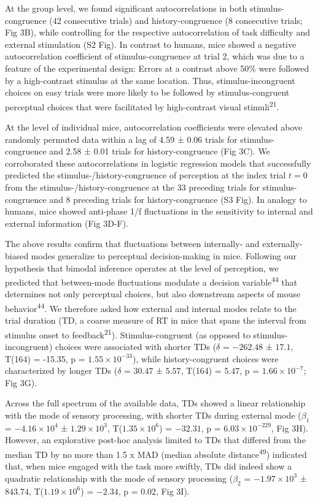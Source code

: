 \documentclass[
]{article}
\begin{document}
At the group level, we found significant autocorrelations in both
stimulus-congruence (42 consecutive trials) and history-congruence (8
consecutive trials; Fig 3B), while controlling for the respective
autocorrelation of task difficulty and external stimulation
(S2 Fig). In contrast to humans, mice showed a
negative autocorrelation coefficient of stimulus-congruence at trial 2,
which was due to a feature of the experimental design: Errors at a
contrast above 50\% were followed by a high-contrast stimulus at the
same location. Thus, stimulus-incongruent choices on easy trials were
more likely to be followed by stimulus-congruent perceptual choices that
were facilitated by high-contrast visual stimuli\textsuperscript{21}.

At the level of individual mice, autocorrelation coefficients were
elevated above randomly permuted data within a lag of 4.59 ± 0.06 trials
for stimulus-congruence and 2.58 ± 0.01 trials for history-congruence
(Fig 3C). We corroborated these autocorrelations in logistic
regression models that successfully predicted the
stimulus-/history-congruence of perception at the index trial \(t = 0\)
from the stimulus-/history-congruence at the 33 preceding trials for
stimulus-congruence and 8 preceding trials for history-congruence
(S3 Fig). In analogy to humans, mice showed anti-phase
1/f fluctuations in the sensitivity to internal and external information
(Fig 3D-F).

The above results confirm that fluctuations between internally- and
externally-biased modes generalize to perceptual decision-making in
mice. Following our hypothesis that bimodal inference operates at the
level of perception, we predicted that between-mode fluctuations
modulate a decision variable\textsuperscript{44} that determines not
only perceptual choices, but also downstream aspects of mouse
behavior\textsuperscript{44}. We therefore asked how external and
internal modes relate to the trial duration (TD, a coarse measure of RT
in mice that spans the interval from stimulus onset to
feedback\textsuperscript{21}). Stimulus-congruent (as opposed to
stimulus-incongruent) choices were associated with shorter TDs
(\(\delta\) = \(-262.48\) ± \(17.1\), T(164) = -15.35, p =
\(\ensuremath{1.55\times 10^{-33}}\)), while history-congruent choices
were characterized by longer TDs (\(\delta\) = \(30.47\) ± \(5.57\),
T(164) = 5.47, p = \(\ensuremath{1.66\times 10^{-7}}\); Fig 3G).

Across the full spectrum of the available data, TDs showed a linear
relationship with the mode of sensory processing, with shorter TDs
during external mode (\(\beta_1\) = \(\ensuremath{-4.16\times 10^{4}}\)
± \(\ensuremath{1.29\times 10^{3}}\),
T(\(\ensuremath{1.35\times 10^{6}}\)) = \(-32.31\), p =
\(\ensuremath{6.03\times 10^{-229}}\), Fig 3H). However, an
explorative post-hoc analysis limited to TDs that differed from the
median TD by no more than 1.5 x MAD (median absolute
distance\textsuperscript{49}) indicated that, when mice engaged with the
task more swiftly, TDs did indeed show a quadratic relationship with the
mode of sensory processing (\(\beta_2\) =
\(\ensuremath{-1.97\times 10^{3}}\) ± \(843.74\),
T(\(\ensuremath{1.19\times 10^{6}}\)) = \(-2.34\), p = \(0.02\), Fig
3I).
\end{document}
